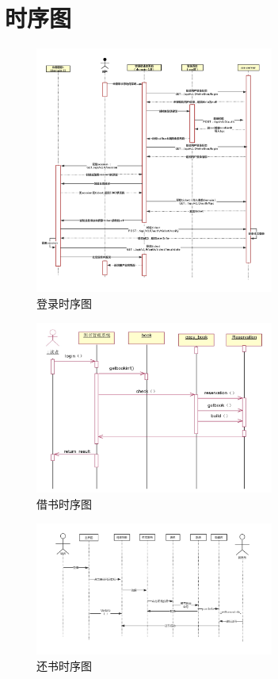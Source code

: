 \section{时序图}
\begin{figure}[H]
    \centering
    \includegraphics[width=0.7\textwidth]{./Chapters/images/time_gram_login.png} %
    \caption{登录时序图} %
    \label{登录时序图} %
\end{figure}
\begin{figure}[H]
    \centering
    \includegraphics[width=0.7\textwidth]{./Chapters/images/time_diagram_borrow.png} %
    \caption{借书时序图} %
    \label{借书时序图} %
\end{figure}
\begin{figure}[H]
    \centering
    \includegraphics[width=0.7\textwidth]{./Chapters/images/time_diagram_back.png} %
    \caption{还书时序图} %
    \label{还书时序图} %
\end{figure}
